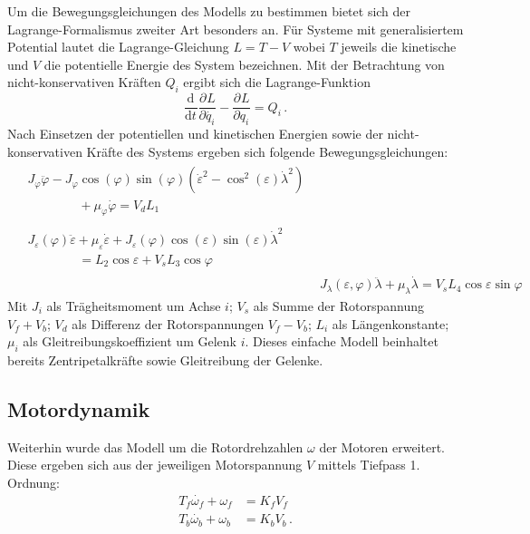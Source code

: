 \documentclass[10pt,twocolumn]{article}
\newcommand{\partiell}[3][]{\frac{\partial^{#1}#2}{\partial{#3}^{#1}}}
\newcommand{\diff}[3][]{\frac{\mathrm{d}^{#1}#2}{\mathrm{d}{#3}^{#1}}}
\begin{document}
	Um die Bewegungsgleichungen des Modells zu bestimmen bietet sich der Lagrange-Formalismus zweiter Art besonders an. Für Systeme mit generalisiertem Potential lautet die Lagrange-Gleichung $L = T -V$ wobei $T$ jeweils die kinetische und $V$ die potentielle Energie des System bezeichnen.
	Mit der Betrachtung von nicht-konservativen Kräften $Q_i$ ergibt sich die Lagrange-Funktion
	\begin{equation}\label{eq:lagrange}
	\diff{}{t} \partiell{L}{\dot{q_i}} - \partiell{L}{q_i}=Q_i\, .
	\end{equation}
	Nach Einsetzen der potentiellen und kinetischen Energien sowie der nicht-konservativen Kräfte des Systems ergeben sich folgende Bewegungsgleichungen:
	\begin{subequations}
		\begin{align}
		\begin{split}
		&J_\varphi \ddot{\varphi} - J_\varphi \cos (\varphi) \sin (\varphi) (\dot{\varepsilon}^2- \cos^2 (\varepsilon) \dot{\lambda}^2)\\
		&\qquad\qquad+ \mu_\varphi \dot{\varphi} = V_d L_1
		\end{split}
		\\
		\begin{split}		
		&J_\varepsilon(\varphi)\ddot{\varepsilon} + \mu_\varepsilon \dot{\varepsilon} + J_\varepsilon(\varphi) \cos (\varepsilon) \sin (\varepsilon) \dot{\lambda}^2\\
		&\qquad\qquad= L_2 \cos \varepsilon + V_s L_3 \cos \varphi
		\end{split}
		\\
		&J_\lambda(\varepsilon,\varphi) \ddot{\lambda} + \mu_\lambda \dot{\lambda} = V_s L_4 \cos \varepsilon \sin \varphi
		\end{align}
		\label{eq:lagrange_result}
	\end{subequations}
	Mit $J_i$ als Trägheitsmoment um Achse $i$; $V_s$ als Summe der Rotorspannung $V_f + V_b$; $V_d$ als Differenz der Rotorspannungen $V_f - V_b$; $L_i$ als Längenkonstante; $\mu_i$ als Gleitreibungskoeffizient um Gelenk $i$. Dieses einfache Modell beinhaltet bereits Zentripetalkräfte sowie Gleitreibung der Gelenke.
	
	\subsection{Motordynamik} \label{sssec:motor}
	
	Weiterhin wurde das Modell um die Rotordrehzahlen $\omega$ der Motoren erweitert. Diese ergeben sich aus der jeweiligen Motorspannung $V$ mittels Tiefpass 1. Ordnung:
	\begin{subequations}
		\begin{align}
		T_f \dot{\omega_f} + \omega_f &= K_f V_f\\
		T_b \dot{\omega_b} + \omega_b &= K_b V_b\, .
		\end{align}
	\end{subequations}
	
\end{document}
